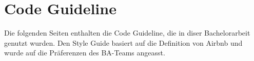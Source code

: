 \chapter{Code Guideline}
\label{sec:code-guideline}
Die folgenden Seiten enthalten die Code Guideline, die in diser Bachelorarbeit genutzt wurden.
Den Style Guide basiert auf die Definition von Airbnb\cite{Airbnb} und wurde auf die Präferenzen des BA-Teams angeasst. \cite{JSGL}

